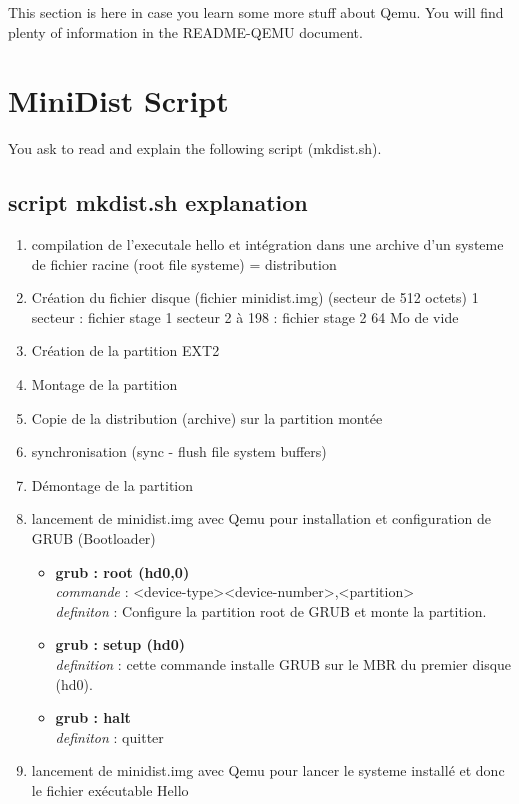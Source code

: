 \documentclass[10]{article}
\begin{document}
This section is here in case you learn some more stuff about Qemu.
You will find plenty of information in the README-QEMU document.

\section{MiniDist Script}

You ask to read and explain the following script (mkdist.sh).
\subsection{script mkdist.sh explanation }
\begin{enumerate}
\item 
compilation de l'executale hello et int\'egration dans une archive d'un systeme de fichier racine (root file systeme) = distribution
\item 
Cr\'eation du fichier disque (fichier minidist.img) (secteur de 512 octets)
	1 secteur : fichier stage 1
	secteur 2 \`a 198 : fichier stage 2 
	64 Mo de vide
\item Cr\'eation de la partition EXT2

\item Montage de la partition
\item Copie de la distribution (archive) sur la partition mont\'ee
\item synchronisation (sync - flush file system buffers)
\item D\'emontage de la partition
\item lancement de minidist.img avec Qemu pour installation et configuration de GRUB (Bootloader)
\begin{itemize}
\item \textbf{grub : root (hd0,0)}\\
\textit{commande} : <device-type><device-number>,<partition> \\
\textit{definiton} :   Configure la partition root de GRUB et monte la partition.
\item \textbf{grub : setup (hd0)} \\
\textit{definition} : cette commande installe GRUB sur le MBR du premier disque (hd0).
\item \textbf{grub : halt}\\
\textit{definiton} : quitter 
\end{itemize}
\item lancement de minidist.img avec Qemu pour lancer le systeme install\'e et donc le fichier ex\'ecutable Hello

\end{enumerate}
\end{document}
